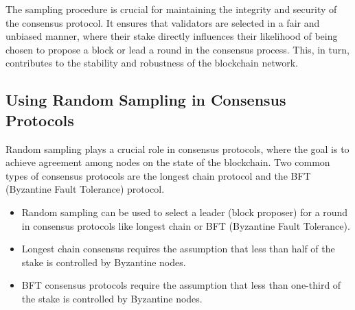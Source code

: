 The sampling procedure is crucial for maintaining the integrity and security of the consensus protocol. It ensures that validators are selected in a fair and unbiased manner, where their stake directly influences their likelihood of being chosen to propose a block or lead a round in the consensus process. This, in turn, contributes to the stability and robustness of the blockchain network.

\subsection{Using Random Sampling in Consensus Protocols}
Random sampling plays a crucial role in consensus protocols, where the goal is to achieve agreement among nodes on the state of the blockchain. Two common types of consensus protocols are the longest chain protocol and the BFT (Byzantine Fault Tolerance) protocol.
\begin{itemize}[label=--]
  \item Random sampling can be used to select a leader (block proposer) for a round in consensus protocols like longest chain or BFT (Byzantine Fault Tolerance).
  \item Longest chain consensus requires the assumption that less than half of the stake is controlled by Byzantine nodes.
  \item BFT consensus protocols require the assumption that less than one-third of the stake is controlled by Byzantine nodes.
\end{itemize}

